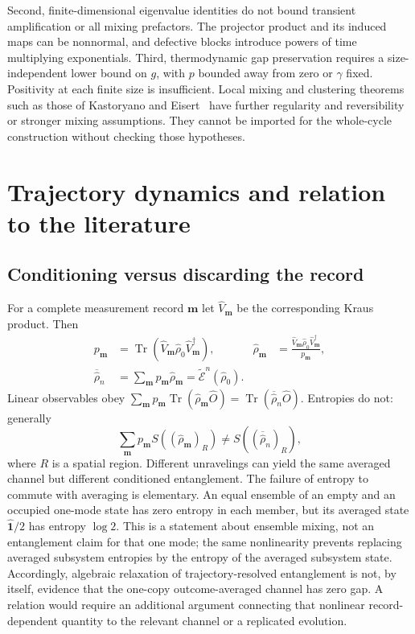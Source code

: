 \documentclass[aps,prb,onecolumn,nofootinbib,superscriptaddress,floatfix]{revtex4-2}
\newcommand{\Id}{\hat{\mathbf 1}}
\newcommand{\Tr}{\operatorname{Tr}}
\newcommand{\E}{\widetilde{\mathcal E}}
\begin{document}
Second, finite-dimensional eigenvalue identities do not bound
transient amplification or all mixing prefactors. The projector
product and its induced maps can be nonnormal, and defective
blocks introduce powers of time multiplying exponentials.
Third, thermodynamic gap preservation requires a size-independent
lower bound on $g$, with $p$ bounded away from zero or $\gamma$
fixed. Positivity at each finite size is insufficient.
Local mixing and clustering theorems such as those of Kastoryano
and Eisert~\cite{KE} have further regularity and reversibility or
stronger mixing assumptions. They cannot be imported for the
whole-cycle construction without checking those hypotheses.

\section{Trajectory dynamics and relation to the literature}
\label{sec:trajectory}
\subsection{Conditioning versus discarding the record}
For a complete measurement record $\bm m$ let $\hat V_{\bm m}$ be
the corresponding Kraus product. Then
\begin{align}
 p_{\bm m}&=\Tr(\hat V_{\bm m}\hat\rho_0\hat V_{\bm m}^\dagger),
 &\hat\rho_{\bm m}&=\frac{\hat V_{\bm m}\hat\rho_0
                   \hat V_{\bm m}^\dagger}{p_{\bm m}},\nonumber\\
 \overline{\hat\rho}_n&=\sum_{\bm m}p_{\bm m}\hat\rho_{\bm m}
                     =\E^n(\hat\rho_0).&& \label{eq:records}
\end{align}
Linear observables obey
$\sum_{\bm m}p_{\bm m}\Tr(\hat\rho_{\bm m}\hat O)
=\Tr(\overline{\hat\rho}_n\hat O)$.
Entropies do not: generally
\begin{equation}
 \sum_{\bm m}p_{\bm m}S((\hat\rho_{\bm m})_R)
       \ne S((\overline{\hat\rho}_n)_R), \label{eq:entropy}
\end{equation}
where $R$ is a spatial region. Different unravelings can yield the
same averaged channel but different conditioned entanglement.
The failure of entropy to commute with averaging is elementary.
An equal ensemble of an empty and an occupied one-mode state
has zero entropy in each member, but its averaged state
$\Id/2$ has entropy $\log 2$. This is a statement about ensemble
mixing, not an entanglement claim for that one mode; the same
nonlinearity prevents replacing averaged subsystem entropies by
the entropy of the averaged subsystem state.
Accordingly, algebraic relaxation of trajectory-resolved
entanglement is not, by itself, evidence that the one-copy
outcome-averaged channel has zero gap. A relation would require an
additional argument connecting that nonlinear record-dependent
quantity to the relevant channel or a replicated evolution.
\end{document}
